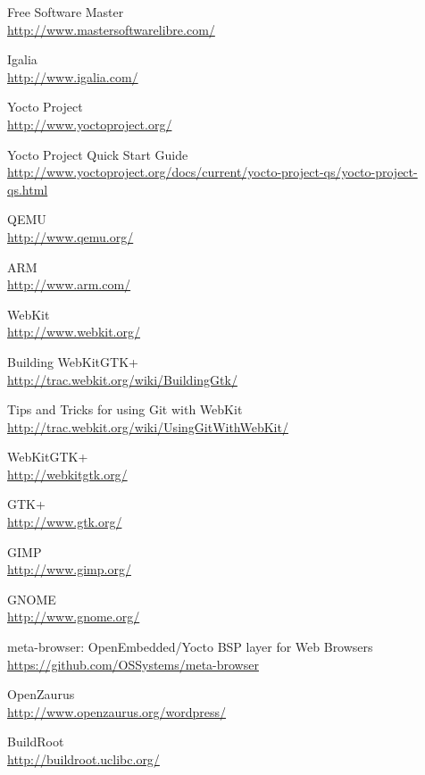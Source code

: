 \documentclass[a4paper,11pt,openany]{report}
\begin{document}
\begin{thebibliography}{ZZ}

Free Software Master\\
\url{http://www.mastersoftwarelibre.com/}

Igalia\\
\url{http://www.igalia.com/}

Yocto Project\\
\url{http://www.yoctoproject.org/}

Yocto Project Quick Start Guide\\
\url{http://www.yoctoproject.org/docs/current/yocto-project-qs/yocto-project-qs.html}

QEMU\\
\url{http://www.qemu.org/}

ARM\\
\url{http://www.arm.com/}

WebKit\\
\url{http://www.webkit.org/}

Building WebKitGTK+\\
\url{http://trac.webkit.org/wiki/BuildingGtk/}

Tips and Tricks for using Git with WebKit\\
\url{http://trac.webkit.org/wiki/UsingGitWithWebKit/}

WebKitGTK+\\
\url{http://webkitgtk.org/}

GTK+\\
\url{http://www.gtk.org/}

GIMP\\
\url{http://www.gimp.org/}

GNOME\\
\url{http://www.gnome.org/}

meta-browser: OpenEmbedded/Yocto BSP layer for Web Browsers\\
\url{https://github.com/OSSystems/meta-browser}

OpenZaurus\\
\url{http://www.openzaurus.org/wordpress/}

BuildRoot\\
\url{http://buildroot.uclibc.org/}


\end{thebibliography}
\end{document}
